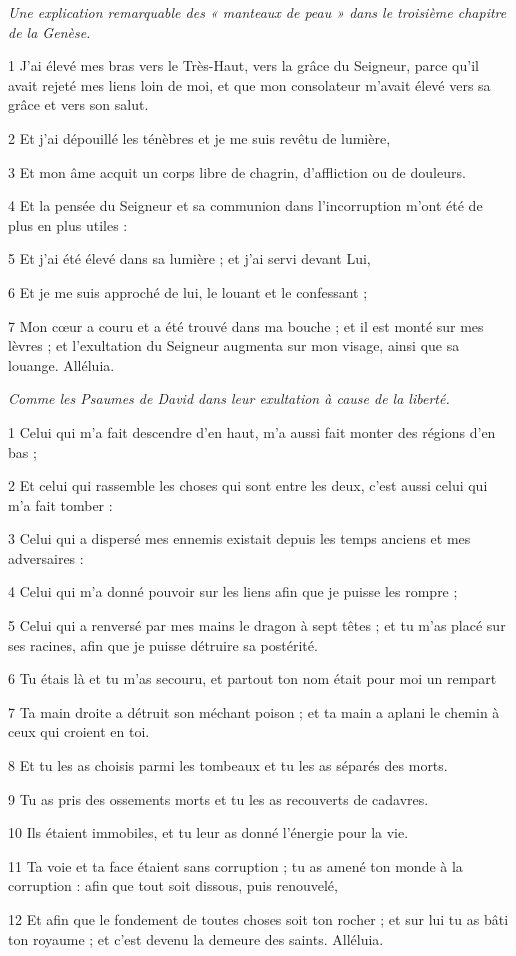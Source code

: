 
\par \textit{Une explication remarquable des « manteaux de peau » dans le troisième chapitre de la Genèse.}

\par 1 J'ai élevé mes bras vers le Très-Haut, vers la grâce du Seigneur, parce qu'il avait rejeté mes liens loin de moi, et que mon consolateur m'avait élevé vers sa grâce et vers son salut.
\par 2 Et j'ai dépouillé les ténèbres et je me suis revêtu de lumière,
\par 3 Et mon âme acquit un corps libre de chagrin, d'affliction ou de douleurs.
\par 4 Et la pensée du Seigneur et sa communion dans l'incorruption m'ont été de plus en plus utiles :
\par 5 Et j'ai été élevé dans sa lumière ; et j'ai servi devant Lui,
\par 6 Et je me suis approché de lui, le louant et le confessant ;
\par 7 Mon cœur a couru et a été trouvé dans ma bouche ; et il est monté sur mes lèvres ; et l'exultation du Seigneur augmenta sur mon visage, ainsi que sa louange. Alléluia.


\par \textit{Comme les Psaumes de David dans leur exultation à cause de la liberté.}

\par 1 Celui qui m'a fait descendre d'en haut, m'a aussi fait monter des régions d'en bas ;
\par 2 Et celui qui rassemble les choses qui sont entre les deux, c'est aussi celui qui m'a fait tomber :
\par 3 Celui qui a dispersé mes ennemis existait depuis les temps anciens et mes adversaires :
\par 4 Celui qui m'a donné pouvoir sur les liens afin que je puisse les rompre ;
\par 5 Celui qui a renversé par mes mains le dragon à sept têtes ; et tu m'as placé sur ses racines, afin que je puisse détruire sa postérité.
\par 6 Tu étais là et tu m'as secouru, et partout ton nom était pour moi un rempart
\par 7 Ta main droite a détruit son méchant poison ; et ta main a aplani le chemin à ceux qui croient en toi.
\par 8 Et tu les as choisis parmi les tombeaux et tu les as séparés des morts.
\par 9 Tu as pris des ossements morts et tu les as recouverts de cadavres.
\par 10 Ils étaient immobiles, et tu leur as donné l'énergie pour la vie.
\par 11 Ta voie et ta face étaient sans corruption ; tu as amené ton monde à la corruption : afin que tout soit dissous, puis renouvelé,
\par 12 Et afin que le fondement de toutes choses soit ton rocher ; et sur lui tu as bâti ton royaume ; et c'est devenu la demeure des saints. Alléluia.

